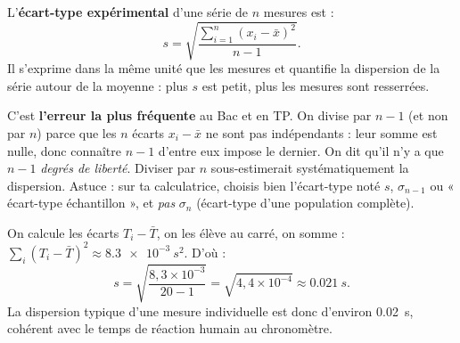 \documentclass[11pt]{article}
\begin{document}
\begin{definition}
L'\textbf{écart-type expérimental} d'une série de $n$ mesures est :
\[
s = \sqrt{\dfrac{\displaystyle\sum_{i=1}^{n}\left(x_i - \bar{x}\right)^2}{n-1}}.
\]
Il s'exprime dans la même unité que les mesures et quantifie la dispersion de la série autour de la moyenne : plus $s$ est petit, plus les mesures sont resserrées.
\end{definition}

\begin{attention}
C'est \textbf{l'erreur la plus fréquente} au Bac et en TP. On divise par $n-1$ (et non par $n$) parce que les $n$ écarts $x_i - \bar{x}$ ne sont pas indépendants : leur somme est nulle, donc connaître $n-1$ d'entre eux impose le dernier. On dit qu'il n'y a que $n-1$ \emph{degrés de liberté}. Diviser par $n$ sous-estimerait systématiquement la dispersion. Astuce : sur ta calculatrice, choisis bien l'écart-type noté $s$, $\sigma_{n-1}$ ou « écart-type échantillon », et \emph{pas} $\sigma_n$ (écart-type d'une population complète).
\end{attention}

\begin{exemplebox}
On calcule les écarts $T_i - \bar{T}$, on les élève au carré, on somme : $\sum_i (T_i - \bar{T})^2 \approx \SI{8,3e-3}{s^2}$. D'où :
\[
s = \sqrt{\frac{8,3\times 10^{-3}}{20-1}} = \sqrt{4,4\times 10^{-4}} \approx \SI{0,021}{s}.
\]
La dispersion typique d'une mesure individuelle est donc d'environ \SI{0,02}{s}, cohérent avec le temps de réaction humain au chronomètre.
\end{exemplebox}
\end{document}
